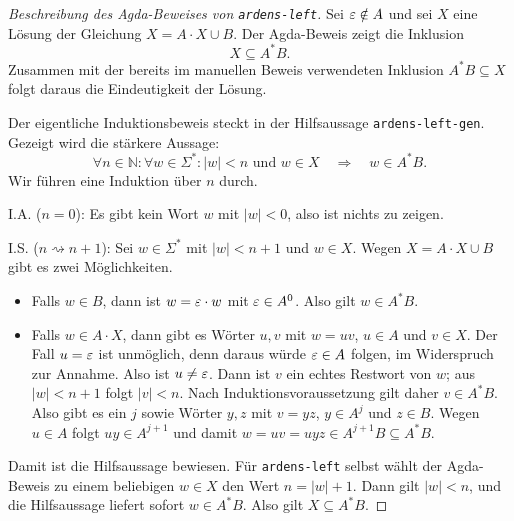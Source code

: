 \begin{proof}[Beschreibung des Agda-Beweises von \texttt{ardens-left}]
Sei $\varepsilon \notin A$ und sei $X$ eine Lösung der Gleichung
$X=A\cdot X\cup B$.
Der Agda-Beweis zeigt die Inklusion
\[
  X \subseteq A^*B .
\]
Zusammen mit der bereits im manuellen Beweis verwendeten Inklusion
$A^*B\subseteq X$ folgt daraus die Eindeutigkeit der Lösung.

Der eigentliche Induktionsbeweis steckt in der Hilfsaussage
\texttt{ardens-left-gen}.
Gezeigt wird die stärkere Aussage:
\[
  \forall n\in\mathbb{N}:\forall w\in\Sigma^*:
  |w|<n \text{ und } w\in X
  \quad\Rightarrow\quad
  w\in A^*B .
\]
Wir führen eine Induktion über $n$ durch.

I.A. ($n=0$): Es gibt kein Wort $w$ mit $|w|<0$, also ist nichts zu zeigen.

I.S. ($n\rightsquigarrow n+1$): Sei $w\in\Sigma^*$ mit $|w|<n+1$ und
$w\in X$.
Wegen $X=A\cdot X\cup B$ gibt es zwei Möglichkeiten.
\begin{itemize}
 \item Falls $w\in B$, dann ist
   $w=\varepsilon\cdot w$ mit $\varepsilon\in A^0$.
   Also gilt $w\in A^*B$.
 \item Falls $w\in A\cdot X$, dann gibt es Wörter $u,v$ mit
   $w=uv$, $u\in A$ und $v\in X$.
   Der Fall $u=\varepsilon$ ist unmöglich, denn daraus würde
   $\varepsilon\in A$ folgen, im Widerspruch zur Annahme.
   Also ist $u\ne\varepsilon$.
   Dann ist $v$ ein echtes Restwort von $w$; aus $|w|<n+1$ folgt
   $|v|<n$.
   Nach Induktionsvoraussetzung gilt daher $v\in A^*B$.
   Also gibt es ein $j$ sowie Wörter $y,z$ mit
   $v=yz$, $y\in A^j$ und $z\in B$.
   Wegen $u\in A$ folgt $uy\in A^{j+1}$ und damit
   $w=uv=uyz\in A^{j+1}B\subseteq A^*B$.
\end{itemize}

Damit ist die Hilfsaussage bewiesen.
Für \texttt{ardens-left} selbst wählt der Agda-Beweis zu einem beliebigen
$w\in X$ den Wert $n=|w|+1$.
Dann gilt $|w|<n$, und die Hilfsaussage liefert sofort $w\in A^*B$.
Also gilt $X\subseteq A^*B$.
\end{proof}

